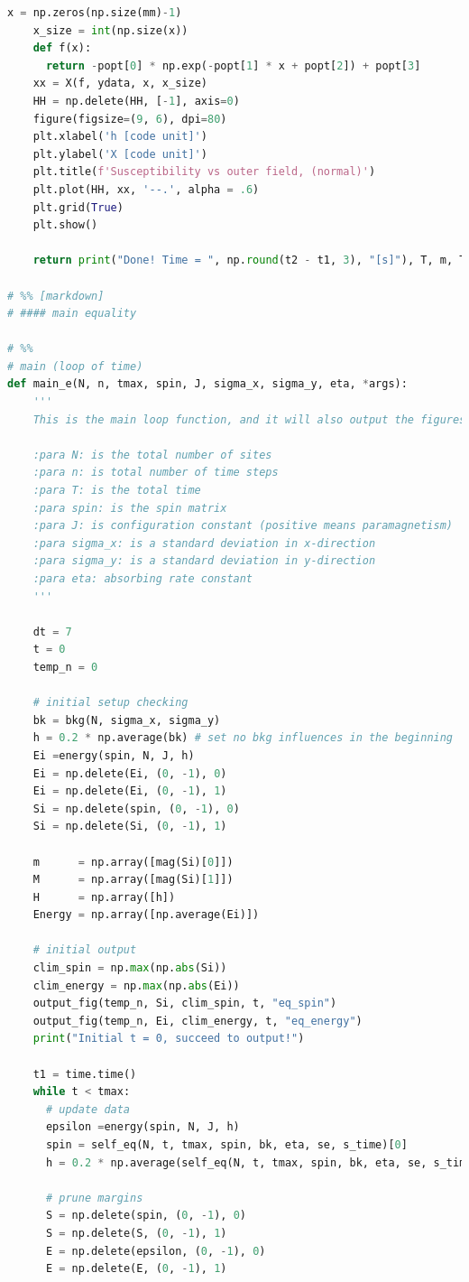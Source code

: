 \documentclass[10pt]{article}
\begin{document}
\begin{lstlisting}[language={Python}]
    x = np.zeros(np.size(mm)-1)
    x_size = int(np.size(x))
    def f(x):
      return -popt[0] * np.exp(-popt[1] * x + popt[2]) + popt[3]
    xx = X(f, ydata, x, x_size)
    HH = np.delete(HH, [-1], axis=0)
    figure(figsize=(9, 6), dpi=80)
    plt.xlabel('h [code unit]')
    plt.ylabel('X [code unit]')
    plt.title(f'Susceptibility vs outer field, (normal)')
    plt.plot(HH, xx, '--.', alpha = .6)
    plt.grid(True)
    plt.show()
    
    return print("Done! Time = ", np.round(t2 - t1, 3), "[s]"), T, m, T, Energy

# %% [markdown]
# #### main equality

# %%
# main (loop of time)
def main_e(N, n, tmax, spin, J, sigma_x, sigma_y, eta, *args):
    '''
    This is the main loop function, and it will also output the figures(.png).

    :para N: is the total number of sites
    :para n: is total number of time steps
    :para T: is the total time
    :para spin: is the spin matrix
    :para J: is configuration constant (positive means paramagnetism)
    :para sigma_x: is a standard deviation in x-direction
    :para sigma_y: is a standard deviation in y-direction
    :para eta: absorbing rate constant
    '''

    dt = 7
    t = 0
    temp_n = 0
    
    # initial setup checking 
    bk = bkg(N, sigma_x, sigma_y)
    h = 0.2 * np.average(bk) # set no bkg influences in the beginning
    Ei =energy(spin, N, J, h)
    Ei = np.delete(Ei, (0, -1), 0)
    Ei = np.delete(Ei, (0, -1), 1)
    Si = np.delete(spin, (0, -1), 0)
    Si = np.delete(Si, (0, -1), 1)
    
    m      = np.array([mag(Si)[0]])
    M      = np.array([mag(Si)[1]])
    H      = np.array([h])
    Energy = np.array([np.average(Ei)])
    
    # initial output
    clim_spin = np.max(np.abs(Si))
    clim_energy = np.max(np.abs(Ei))
    output_fig(temp_n, Si, clim_spin, t, "eq_spin")
    output_fig(temp_n, Ei, clim_energy, t, "eq_energy")
    print("Initial t = 0, succeed to output!")

    t1 = time.time()
    while t < tmax:
      # update data
      epsilon =energy(spin, N, J, h)
      spin = self_eq(N, t, tmax, spin, bk, eta, se, s_time)[0]
      h = 0.2 * np.average(self_eq(N, t, tmax, spin, bk, eta, se, s_time)[1])
      
      # prune margins
      S = np.delete(spin, (0, -1), 0)
      S = np.delete(S, (0, -1), 1)
      E = np.delete(epsilon, (0, -1), 0)
      E = np.delete(E, (0, -1), 1)
      

\end{lstlisting}
\end{document}
